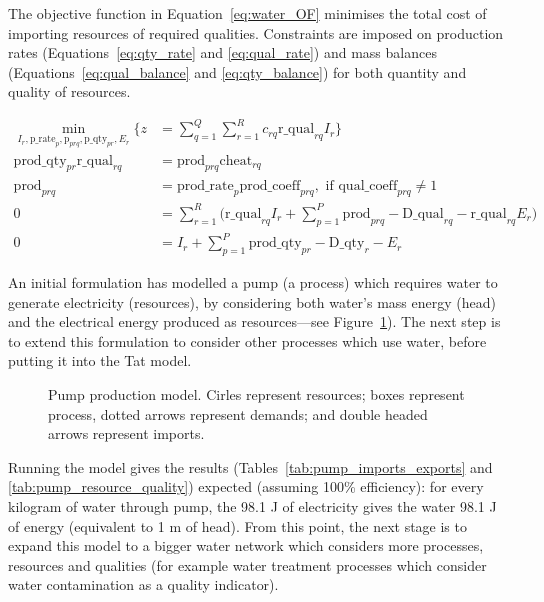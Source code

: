 The objective function in Equation~\eqref{eq:water_OF} minimises the total cost of importing resources of required qualities. Constraints are imposed on production rates (Equations~\eqref{eq:qty_rate} and \eqref{eq:qual_rate}) and mass balances (Equations~\eqref{eq:qual_balance} and \eqref{eq:qty_balance}) for both quantity and quality of resources.

\begin{align}
	\min_{I_r,\mbox{p\_rate}_p,\mbox{p}_{prq},\mbox{p\_qty}_{pr},E_r} \Bigg\{z&=\sum_{q=1}^Q \sum_{r=1}^R c_{rq}\mbox{r\_qual}_{rq}I_{r}\Bigg\} \label{eq:water_OF} \\
	\mbox{prod\_qty}_{pr} \mbox{r\_qual}_{rq} &= \mbox{prod}_{prq} \mbox{cheat}_{rq} \label{eq:qty_rate} \\ 
	\mbox{prod}_{prq} &= \mbox{prod\_rate}_{p} \mbox{prod\_coeff}_{prq}, \mbox{    if } \mbox{qual\_coeff}_{prq} \neq 1 \label{eq:qual_rate} \\
	0 &= \sum_{r=1}^R \Bigg(\mbox{r\_qual}_{rq} I_r + \sum_{p=1}^P \mbox{prod}_{prq} - \mbox{D\_qual}_{rq} - \mbox{r\_qual}_{rq} E_r \Bigg) \label{eq:qual_balance} \\
	0 &= I_r + \sum_{p=1}^P\mbox{prod\_qty}_{pr} - \mbox{D\_qty}_{r}-E_r \label{eq:qty_balance} 
\end{align}

An initial formulation has modelled a pump (a process) which requires water to generate electricity (resources), by considering both water's mass energy (head) and the electrical energy produced as resources---see Figure~\ref{fig:pump}). The next step is to extend this formulation to consider other processes which use water, before putting it into the Tat model.

\begin{figure}[h]
	\centering
	
	\caption{Pump production model. Cirles represent resources; boxes represent process, dotted arrows represent demands; and double headed arrows represent imports.} \label{fig:pump}
\end{figure}
Running the model gives the results (Tables~\ref{tab:pump_imports_exports} and \ref{tab:pump_resource_quality}) expected (assuming 100\% efficiency): for every kilogram of water through pump, the 98.1 J of electricity gives the water 98.1 J of energy (equivalent to 1 m of head). From this point, the next stage is to expand this model to a bigger water network which considers more processes, resources and qualities (for example water treatment processes which consider water contamination as a quality indicator).

 
 
